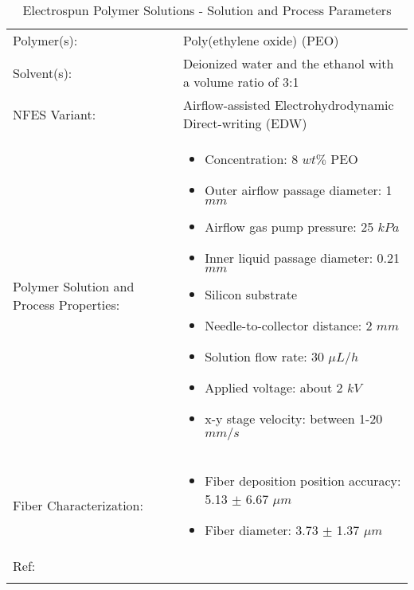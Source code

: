 \begin{table}[th]
\caption{Electrospun Polymer Solutions - Solution and Process Parameters}
\begin{center}
\begin{tabular}{
>{\raggedright\arraybackslash}p{}
>{\raggedright\arraybackslash}p{} }

\hline
Polymer(s): &
Poly(ethylene oxide) (PEO) \\

\arrayrulecolor{lightgray}\hline
Solvent(s): &
Deionized water and the ethanol with a volume ratio of 3:1 \\

\hline
NFES Variant: &
Airflow-assisted Electrohydrodynamic Direct-writing (EDW) \\

\hline
Polymer Solution and Process Properties: &
\begin{itemize}[leftmargin=*]
\item Concentration: 8 $w t \%$ PEO
\item Outer airflow passage diameter: 1 $m m$
\item Airflow gas pump pressure: 25 $k Pa$
\item Inner liquid passage diameter: 0.21 $m m$
\item Silicon substrate
\item Needle-to-collector distance: 2 $m m$
\item Solution flow rate: 30 $\mu L / h$
\item Applied voltage: about 2 $k V$
\item x-y stage velocity: between 1-20 $m m / s$
\end{itemize} \\

\hline
Fiber Characterization: &
\begin{itemize}[leftmargin=*]
\item Fiber deposition position accuracy: 5.13 $\pm$ 6.67 $\mu m$
\item Fiber diameter: 3.73 $\pm$ 1.37 $\mu m$
\end{itemize} \\

\hline
Ref: & \cite{Jiang2018} \\ %
\arrayrulecolor{black}\hline
\label{tbl:FloresCompare}
\end{tabular}
\end{center}
\end{table}

